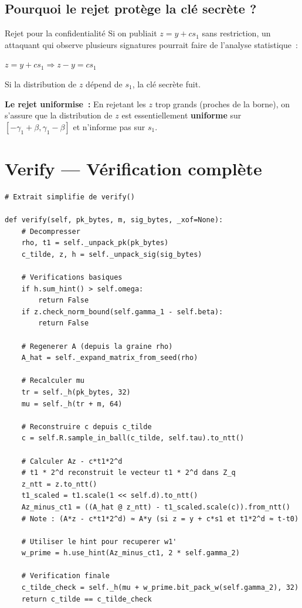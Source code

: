 \documentclass[12pt, a4paper]{article}
\begin{document}
\subsection{Pourquoi le rejet protège la clé secrète ?}

\begin{theorembox}{Rejet pour la confidentialité}
Si on publiait $z = y + cs_1$ sans restriction, un attaquant qui observe
plusieurs signatures pourrait faire de l'analyse statistique~:

$z = y + cs_1 \Rightarrow z - y = cs_1$

Si la distribution de $z$ dépend de $s_1$, la clé secrète fuit.

\textbf{Le rejet uniformise~:} En rejetant les $z$ trop grands (proches
de la borne), on s'assure que la distribution de $z$ est essentiellement
\textbf{uniforme} sur $[-\gamma_1+\beta, \gamma_1-\beta]$ et n'informe
pas sur $s_1$.
\end{theorembox}

\section{Verify --- Vérification complète}

\begin{lstlisting}[style=python]
# Extrait simplifie de verify()

def verify(self, pk_bytes, m, sig_bytes, _xof=None):
    # Decompresser
    rho, t1 = self._unpack_pk(pk_bytes)
    c_tilde, z, h = self._unpack_sig(sig_bytes)

    # Verifications basiques
    if h.sum_hint() > self.omega:
        return False
    if z.check_norm_bound(self.gamma_1 - self.beta):
        return False

    # Regenerer A (depuis la graine rho)
    A_hat = self._expand_matrix_from_seed(rho)

    # Recalculer mu
    tr = self._h(pk_bytes, 32)
    mu = self._h(tr + m, 64)

    # Reconstruire c depuis c_tilde
    c = self.R.sample_in_ball(c_tilde, self.tau).to_ntt()

    # Calculer Az - c*t1*2^d
    # t1 * 2^d reconstruit le vecteur t1 * 2^d dans Z_q
    z_ntt = z.to_ntt()
    t1_scaled = t1.scale(1 << self.d).to_ntt()
    Az_minus_ct1 = ((A_hat @ z_ntt) - t1_scaled.scale(c)).from_ntt()
    # Note : (A*z - c*t1*2^d) ≈ A*y (si z = y + c*s1 et t1*2^d ≈ t-t0)

    # Utiliser le hint pour recuperer w1'
    w_prime = h.use_hint(Az_minus_ct1, 2 * self.gamma_2)

    # Verification finale
    c_tilde_check = self._h(mu + w_prime.bit_pack_w(self.gamma_2), 32)
    return c_tilde == c_tilde_check
\end{lstlisting}
\end{document}
